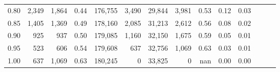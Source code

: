 \begin{tabular}{rrrrrrrrrrrrrr}
0.80 &   2,349 &  1,864 &  0.44 &  176,755 &    3,490 &  29,844 &   3,981 &  0.53 &  0.12 &      0.03 \\
0.85 &   1,405 &  1,369 &  0.49 &  178,160 &    2,085 &  31,213 &   2,612 &  0.56 &  0.08 &      0.02 \\
0.90 &     925 &    937 &  0.50 &  179,085 &    1,160 &  32,150 &   1,675 &  0.59 &  0.05 &      0.01 \\
0.95 &     523 &    606 &  0.54 &  179,608 &      637 &  32,756 &   1,069 &  0.63 &  0.03 &      0.01 \\
1.00 &     637 &  1,069 &  0.63 &  180,245 &        0 &  33,825 &       0 &   nan &  0.00 &      0.00 \\
\bottomrule
\end{tabular}
